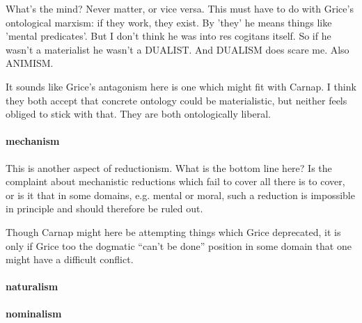 \documentclass[10pt,titlepage]{book}
\newcommand{\ignore}[1]{}
\begin{document}
What's the mind? Never matter, or vice versa. This must have  
to do with Grice's ontological marxism: if they work, they exist. By 'they' 
he  means things like 'mental predicates'. But I don't think he was into res 
 cogitans itself. So if he wasn't a materialist he wasn't a DUALIST. And 
DUALISM  does scare me. Also ANIMISM.

It sounds like Grice's antagonism here is one which might fit with Carnap.
I think they both accept that concrete ontology could be materialistic, but neither feels obliged to stick with that.
They are both ontologically liberal.
 
\paragraph{mechanism}

This is another aspect of reductionism.
What is the bottom line here?
Is the complaint about mechanistic reductions which fail to cover all there is to cover, or is it that in some domains, e.g. mental or moral, such a reduction is impossible in principle and should therefore be ruled out.

Though Carnap might here be attempting things which Grice deprecated, it is only if Grice too the dogmatic ``can't be done'' position in some domain that one might have a difficult conflict.
 
\paragraph{naturalism}

\ignore{
He does say that mean-N is the basis for mean-NN, so I think,  
or am pretty sure he means here a scheme that leaves VALUE out of the 
picture.  Especially concerned with the non-naturalistic basis of reason or 
rationality:  if rationality is a faculty OVER our pre-rational, natural, 
dispositions, it  cannot be "natural" herself. Etc.
} 

\paragraph{nominalism}

\ignore{
This must be a joke unless he is thinking of those ridiculous  
theories by Scheffler. Type/token Grice always used. He uses x to symbolise  
token, X to symbolise type. He may be objecting to an extensional treatment 
of  'classes'. Etc. He may be thinking of higher-order predicate-calculus 
where we  can substantivise over properties, etc. alla Strawson, Subject and 
predicate in  logic and grammar.
} 
\end{document}
